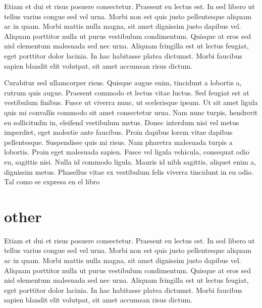 \documentclass[12pt,letterpaper,oneside]{book}
\begin{document}
 Etiam et dui et risus posuere consectetur. Praesent eu lectus est. In sed libero ut tellus varius congue sed vel urna. Morbi non est quis justo pellentesque aliquam ac in quam. Morbi mattis nulla magna, sit amet dignissim justo dapibus vel. Aliquam porttitor nulla ut purus vestibulum condimentum. Quisque at eros sed nisl elementum malesuada sed nec urna. Aliquam fringilla est ut lectus feugiat, eget porttitor dolor lacinia. In hac habitasse platea dictumst. Morbi faucibus sapien blandit elit volutpat, sit amet accumsan risus dictum.

Curabitur sed ullamcorper risus. Quisque augue enim, tincidunt a lobortis a, rutrum quis augue. Praesent commodo et lectus vitae luctus. Sed feugiat est at vestibulum finibus. Fusce ut viverra nunc, ut scelerisque ipsum. Ut sit amet ligula quis mi convallis commodo sit amet consectetur urna. Nam nunc turpis, hendrerit eu sollicitudin in, eleifend vestibulum metus. Donec interdum nisi vel metus imperdiet, eget molestie ante faucibus. Proin dapibus lorem vitae dapibus pellentesque. Suspendisse quis mi risus. Nam pharetra malesuada turpis a lobortis. Proin eget malesuada sapien. Fusce vel ligula vehicula, consequat odio eu, sagittis nisi. Nulla id commodo ligula. Mauris id nibh sagittis, aliquet enim a, dignissim metus. Phasellus vitae ex vestibulum felis viverra tincidunt in eu odio. Tal como se expresa en el libro \cite{Vapnik1998}

\section{other}
 Etiam et dui et risus posuere consectetur. Praesent eu lectus est. In sed libero ut tellus varius congue sed vel urna. Morbi non est quis justo pellentesque aliquam ac in quam. Morbi mattis nulla magna, sit amet dignissim justo dapibus vel. Aliquam porttitor nulla ut purus vestibulum condimentum. Quisque at eros sed nisl elementum malesuada sed nec urna. Aliquam fringilla est ut lectus feugiat, eget porttitor dolor lacinia. In hac habitasse platea dictumst. Morbi faucibus sapien blandit elit volutpat, sit amet accumsan risus dictum.
\end{document}
